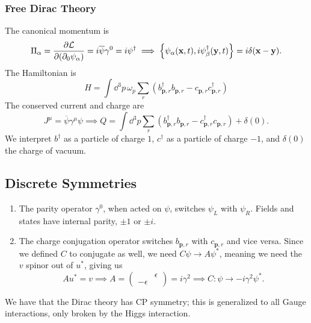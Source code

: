 \documentclass{article}
\begin{document}
\subsubsection{Free Dirac Theory}

The canonical momentum is 
\begin{equation}
    \Pi_\alpha=\pde{\mathcal L}{(\partial_0\psi_\alpha)}=i\overline\psi\gamma^0=i\psi^\dag\implies\acomm{\psi_\alpha(\mathbf x,t)}{i\psi^\dag_\beta(\mathbf y,t)}=i\delta(\mathbf x-\mathbf y).
\end{equation}
The Hamiltonian is 
\begin{equation}
    H=\int\dd^3p\,\omega_p\sum_r\left(b^\dag_{\mathbf p,r}b_{\mathbf p,r}-c_{\mathbf p,r}c^\dag_{\mathbf p,r}\right)
\end{equation}
The conserved current and charge are 
\begin{equation}
    J^\mu=\overline\psi\gamma^\mu\psi\implies Q=\int\dd^3p\sum_r\left(b^\dag_{\mathbf p,r}b_{\mathbf p,r}-c^\dag_{\mathbf p,r}c_{\mathbf p,r}\right)+\delta(0).
\end{equation}
We interpret $b^\dag$ as a particle of charge $1$, $c^\dag$ as a particle of charge $-1$, and $\delta(0)$ the charge of vacuum. 

\subsection{Discrete Symmetries}

\begin{enumerate}[label=(\alph*)]
    \item The parity operator $\gamma^0$, when acted on $\psi$, switches $\psi_L$ with $\psi_R$. Fields and states have internal parity, $\pm 1$ or $\pm i$. 
    \item The charge conjugation operator switches $b_{\mathbf p,r}$ with $c_{\mathbf p,r}$ and vice versa. Since we defined $C$ to conjugate as well, we need $C\psi\to A\psi^*$, meaning we need the $v$ spinor out of $u^*$, giving us
    \begin{equation}
        Au^*=v\implies A=\begin{pmatrix}&\epsilon\\-\epsilon\end{pmatrix}=i\gamma^2\implies C:\psi\to-i\gamma^2\psi^*.
    \end{equation}
\end{enumerate}

We have that the Dirac theory has CP symmetry; this is generalized to all Gauge interactions, only broken by the Higgs interaction.
\end{document}
